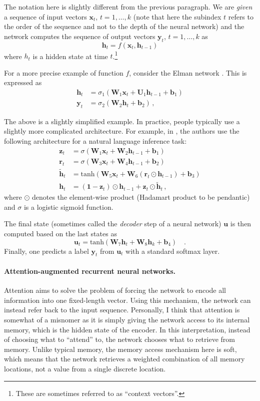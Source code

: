 \documentclass[paper=a4, fontsize=11pt,twoside, abstracton]{scrartcl}
\def\xx{{\boldsymbol x}}
\def\uu{{\boldsymbol u}}
\def\yy{{\boldsymbol y}}
\def\hh{{\boldsymbol h}}
\def\WW{{\boldsymbol W}}
\def\zz{{\boldsymbol z}}
\def\bb{{\boldsymbol b}}
\begin{document}
The notation here is slightly different from the previous paragraph. We are \emph{given} a sequence of input vectors $\xx_{t}$, $t=1, \ldots, k$ (note that here the subindex $t$ refers to the order of the sequence and not to the depth of the neural network) and the network computes the sequence of output vectors $\yy_{t}$, $t=1, \ldots, k$ as $$\hh_t = f(\xx_t, \hh_{t-1})$$ where $h_t$ is a hidden state at time $t$.\footnote{These are sometimes referred to as ``context vectors''.}

 For a more precise example of function $f$, consider the Elman network \citep{elman1990finding}. This is expressed as
  \begin{align}
    \hh_{t} &= \sigma_1(\WW_1 \xx_t + \boldsymbol{U}_1 \hh_{t-1} + \boldsymbol{b}_1)  \\
    \yy_t &= \sigma_2(\WW_2\hh_t + \boldsymbol{b}_2)\,,
  \end{align}

The above is a slightly simplified example. In practice, people typically use a slightly more complicated architecture. For example, in \citep{cho2014learning}, the authors use the following architecture for a natural language inference task:
  \begin{align}
    \zz_t &= \sigma(\WW_1 \xx_t + \WW_2 \hh_{t-1} + \bb_1) \\
    \boldsymbol{r}_t &= \sigma(\WW_3 \xx_t + \WW_4 \hh_{t-1} + \bb_2) \\
    \tilde{\hh}_t &= \text{tanh}(\WW_5 \xx_t + \WW_6 (\boldsymbol{r}_t  \odot \hh_{t-1}) + \bb_3) \\
    \hh_t &= (\boldsymbol{1} - \zz_t) \odot \hh_{t-1} + \zz_t \odot\tilde{\hh}_t\,,
  \end{align}
where $\odot$ denotes the element-wise product (Hadamart product to be pendantic) and $\sigma$ is a logistic sigmoid function.

The final state (sometimes called the \emph{decoder} step of a neural network) $\boldsymbol u$ is then computed based on the last states as
\begin{equation}\label{eq:rnn_prediction}
  \uu_t = \text{tanh}(\WW_7 \hh_t + \WW_8 \hh_k + \bb_4) \quad.
\end{equation}
Finally, one predicts a label $\yy_{t}$ from $\uu_t$ with a standard softmax layer.



\paragraph{Attention-augmented recurrent neural networks.} Attention aims to solve the problem of forcing the network to encode all information into one fixed-length vector. Using this mechanism, the network can instead refer back to the input sequence. Personally, I think that attention is somewhat of a misnomer as it is simply giving the network access to its internal memory, which is the hidden state of the encoder. In this interpretation, instead of choosing what to  ``attend'' to, the network chooses what to retrieve from memory. Unlike typical memory, the memory access mechanism here is soft, which means that the network retrieves a weighted combination of all memory locations, not a value from a single discrete location.
\end{document}
